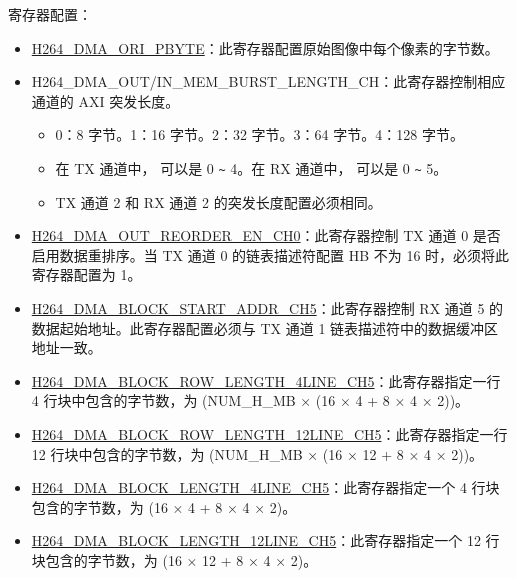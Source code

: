 \documentclass[main\_\_CN.tex]{subfiles}
\begin{document}
寄存器配置：
\begin{itemize}
    \item \hyperref[fielddesc:H264DMAORIPBYTE]{H264\_DMA\_ORI\_PBYTE}：此寄存器配置原始图像中每个像素的字节数。
    \item H264\_DMA\_OUT/IN\_MEM\_BURST\_LENGTH\_CH：此寄存器控制相应通道的 AXI 突发长度。
    \begin{itemize}
        \item 0：8 字节。1：16 字节。2：32 字节。3：64 字节。4：128 字节。
        \item 在 TX 通道中， 可以是 0 \verb+~+ 4。在 RX 通道中， 可以是 0 \verb+~+ 5。
        \item TX 通道 2 和 RX 通道 2 的突发长度配置必须相同。
    \end{itemize}
    \item \hyperref[fielddesc:H264DMAOUTREORDERENCH0]{H264\_DMA\_OUT\_REORDER\_EN\_CH0}：此寄存器控制 TX 通道 0 是否启用数据重排序。当 TX 通道 0 的链表描述符配置 HB 不为 16 时，必须将此寄存器配置为 1。
    \item \hyperref[fielddesc:H264DMABLOCKSTARTADDRCH5]{H264\_DMA\_BLOCK\_START\_ADDR\_CH5}：此寄存器控制 RX 通道 5 的数据起始地址。此寄存器配置必须与 TX 通道 1 链表描述符中的数据缓冲区地址一致。
    \item \hyperref[fielddesc:H264DMABLOCKROWLENGTH4LINECH5]{H264\_DMA\_BLOCK\_ROW\_LENGTH\_4LINE\_CH5}：此寄存器指定一行 4 行块中包含的字节数，为 (NUM\_H\_MB × (16 × 4 + 8 × 4 × 2))。
    \item \hyperref[fielddesc:H264DMABLOCKROWLENGTH12LINECH5]{H264\_DMA\_BLOCK\_ROW\_LENGTH\_12LINE\_CH5}：此寄存器指定一行 12 行块中包含的字节数，为 (NUM\_H\_MB × (16 × 12 + 8 × 4 × 2))。
    \item \hyperref[fielddesc:H264DMABLOCKLENGTH4LINECH5]{H264\_DMA\_BLOCK\_LENGTH\_4LINE\_CH5}：此寄存器指定一个 4 行块包含的字节数，为 (16 × 4 + 8 × 4 × 2)。
    \item \hyperref[fielddesc:H264DMABLOCKLENGTH12LINECH5]{H264\_DMA\_BLOCK\_LENGTH\_12LINE\_CH5}：此寄存器指定一个 12 行块包含的字节数，为 (16 × 12 + 8 × 4 × 2)。
\end{itemize}

\end{document}
